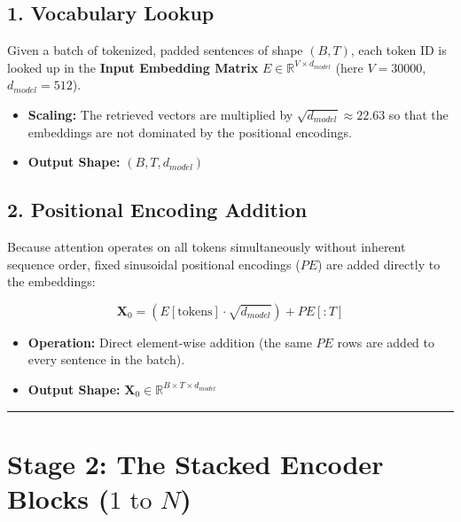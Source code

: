 \documentclass[11pt,a4paper,oneside]{report}
\providecommand{\tightlist}{\setlength{\itemsep}{0pt}\setlength{\parskip}{0pt}}
\begin{document}
\subsection{1. Vocabulary Lookup}\label{1-vocabulary-lookup}

Given a batch of tokenized, padded sentences of shape \((B, T)\), each token ID is looked up in the \textbf{Input Embedding Matrix} \(E \in \mathbb{R}^{V \times d_{model}}\) (here \(V = 30000\), \(d_{model} = 512\)).

\begin{itemize}
\tightlist
\item
  \textbf{Scaling:} The retrieved vectors are multiplied by \(\sqrt{d_{model}} \approx 22.63\) so that the embeddings are not dominated by the positional encodings.
\item
  \textbf{Output Shape:} \((B, T, d_{model})\)
\end{itemize}

\subsection{2. Positional Encoding Addition}\label{2-positional-encoding-addition}

Because attention operates on all tokens simultaneously without inherent sequence order, fixed sinusoidal positional encodings (\(PE\)) are added directly to the embeddings:

\begin{center}\end{center}

\[\mathbf{X}_0 = (E[\text{tokens}] \cdot \sqrt{d_{model}}) + PE[:T]\]

\begin{itemize}
\tightlist
\item
  \textbf{Operation:} Direct element-wise addition (the same \(PE\) rows are added to every sentence in the batch).
\item
  \textbf{Output Shape:} \(\mathbf{X}_0 \in \mathbb{R}^{B \times T \times d_{model}}\)
\end{itemize}

\begin{center}\rule{0.5\linewidth}{0.5pt}\end{center}

\section{\texorpdfstring{Stage 2: The Stacked Encoder Blocks (\(1 \text{ to } N\))}{Stage 2: The Stacked Encoder Blocks (1 \textbackslash text\{ to \} N)}}\label{stage-2-the-stacked-encoder-blocks-1-text-to--n}
\end{document}
